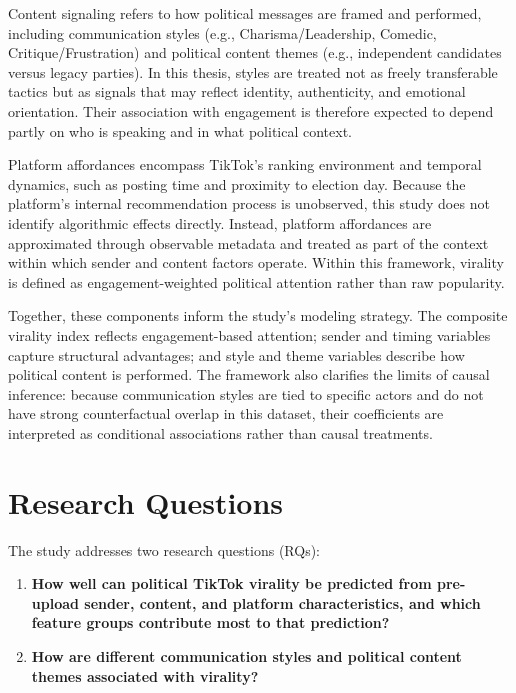 \documentclass[12pt,a4paper]{report}
\begin{document}
Content signaling refers to how political messages are framed and performed, including communication styles (e.g., Charisma/Leadership, Comedic, Critique/Frustration) and political content themes (e.g., independent candidates versus legacy parties). In this thesis, styles are treated not as freely transferable tactics but as signals that may reflect identity, authenticity, and emotional orientation. Their association with engagement is therefore expected to depend partly on who is speaking and in what political context.

Platform affordances encompass TikTok's ranking environment and temporal dynamics, such as posting time and proximity to election day. Because the platform's internal recommendation process is unobserved, this study does not identify algorithmic effects directly. Instead, platform affordances are approximated through observable metadata and treated as part of the context within which sender and content factors operate. Within this framework, virality is defined as engagement-weighted political attention rather than raw popularity.

Together, these components inform the study's modeling strategy. The composite virality index reflects engagement-based attention; sender and timing variables capture structural advantages; and style and theme variables describe how political content is performed. The framework also clarifies the limits of causal inference: because communication styles are tied to specific actors and do not have strong counterfactual overlap in this dataset, their coefficients are interpreted as conditional associations rather than causal treatments.


\chapter{Research Questions}
\label{sec:research_questions}

The study addresses two research questions (RQs):

\begin{enumerate}[label=RQ\arabic*:, leftmargin=*]
    \item \textbf{How well can political TikTok virality be predicted from pre-upload sender, content, and platform characteristics, and which feature groups contribute most to that prediction?}
    

    \item \textbf{How are different communication styles and political content themes associated with virality?}

    
\end{enumerate}
\end{document}

